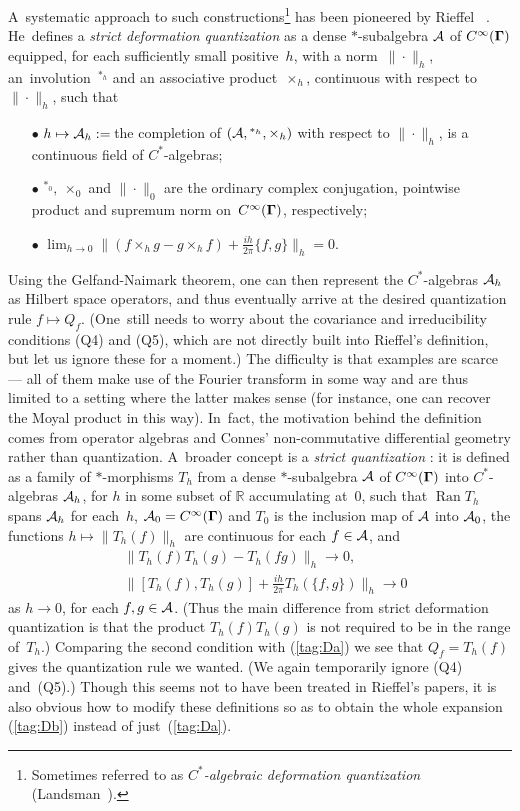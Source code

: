 \documentclass[12pt]{amsart}
\numberwithin{equation}{section}
\theoremstyle{remark}
\newcommand\AAA{{\Cal A}}
\newcommand\Omg{{\bigam}}   %
\newcommand\RR{\mathbb R}
\newcommand{\bigam}{\mbox{\boldmath $\Gamma$}}
\begin{document}
A~systematic approach to such constructions\footnote{Sometimes referred to as
{\it $C^*$-algebraic deformation quantization\/}
(Landsman~\cite{bib:+tgtgrp}).} has been pioneered by Rieffel \cite{bib:RiefA}
\cite{bib:RiefB}~\cite{bib:RiefM}. He~defines a {\it strict deformation
quantization\/} as a dense $*$-subalgebra $\AAA$ of $C^\infty(\Omg)$ equipped,
for each sufficiently small positive~$h$, with a norm~$\|\cdot\|_h$,
an~involution~${}^{*_h}$ and an associative product~$\times_h$, continuous
with respect to~$\|\cdot\|_h$, such that
\begin{enumerate}
\item[$\bullet$] $h\mapsto\AAA_h:=\,$the completion of $(\AAA,{}^{*_h},
\times_h)$ with respect to $\|\cdot\|_h$, is a continuous field of
$C^*$-algebras;
\item[$\bullet$] ${}^{*_0},\ \times_0$ and $\|\cdot\|_0$ are the ordinary
complex conjugation, pointwise product and supremum norm on~$C^\infty(\Omg)$,
respectively;
\item[$\bullet$] $\lim_{h\to0} \|(f\times_h g-g\times_h f) + \tfrac{ih}{2\pi}
\{f,g\}\|_h =0$.
\end{enumerate}
Using the Gelfand-Naimark theorem, one can then represent the $C^*$-algebras
$\AAA_h$ as Hilbert space operators, and thus eventually arrive at the
desired quantization rule $f\mapsto Q_f$. (One~still needs to worry about the
covariance and irreducibility conditions (Q4) and (Q5), which are not directly
built into Rieffel's definition, but let us ignore these for a moment.) The
difficulty is that examples are scarce --- all of them make use of the Fourier
transform in some way and are thus limited to a setting where the latter makes
sense (for instance, one can recover the Moyal product in this way). In~fact,
the motivation behind the definition comes from operator algebras and Connes'
non-commutative differential geometry rather than quantization. A~broader
concept is a {\it strict quantization\/} \cite{bib:Rief}: it is defined as a
family of $*$-morphisms $T_h$ from a dense $*$-subalgebra $\AAA$ of
$C^\infty(\Omg)$ into $C^*$-algebras $\AAA_h$, for $h$ in some subset of $\RR$
accumulating at~0, such that $\operatorname{Ran} T_h$ spans $\AAA_h$ for
each~$h$, $\AAA_0=C^\infty(\Omg)$ and $T_0$ is the inclusion map of $\AAA$ into
$\AAA_0$, the functions $h\mapsto\|T_h(f)\|_h$ are continuous for each
$f\in\AAA$, and
\begin{equation}  \begin{aligned}
& \|T_h(f) T_h(g) - T_h(fg)\|_h \to 0  , \\
& \|[T_h(f),T_h(g)] + \frac{ih}{2\pi} T_h(\{f,g\})\|_h \to 0 \end{aligned}
\label{tag:Rj}  \end{equation}
as $h\to0$, for each $f,g\in\AAA$. (Thus the main difference from strict
deformation quantization is that the product $T_h(f)T_h(g)$ is not required to
be in the range of~$T_h$.) Comparing the second condition with (\ref{tag:Da})
we see that $Q_f=T_h(f)$ gives the quantization rule we wanted. (We again
temporarily ignore (Q4) and~(Q5).) Though this seems not to have been treated
in Rieffel's papers, it is also obvious how to modify these definitions so as
to obtain the whole expansion (\ref{tag:Db}) instead of just~(\ref{tag:Da}).
\end{document}
